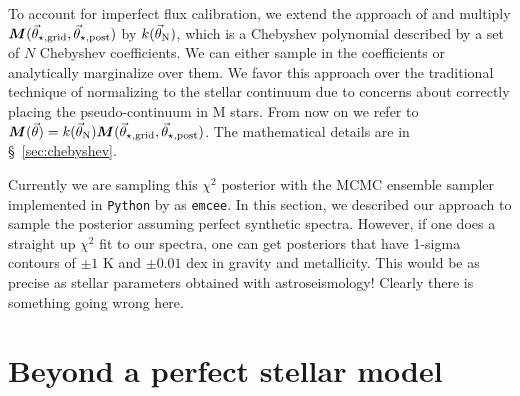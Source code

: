\documentclass[preprint]{aastex} %
\newcommand{\vt}{\vec{\theta}}
\newcommand{\vg}{\vt_{\star, {\rm grid}}}
\newcommand{\vpp}{\vt_{\star, {\rm post}}}
\newcommand{\vN}{\vt_{\rm N}}
\newcommand{\fM}{ {\bm M}}
\begin{document}
To account for imperfect flux calibration, we extend the approach of \citet{elh+06} and multiply $\fM(\vg, \vpp)$ by $k(\vN)$, which is a Chebyshev polynomial described by a set of $N$ Chebyshev coefficients. We can either sample in the coefficients or analytically marginalize over them. We favor this approach over the traditional technique of normalizing to the stellar continuum due to concerns about correctly placing the pseudo-continuum in M stars. From now on we refer to $\fM(\vt) = k(\vN) \fM(\vg, \vpp)$. The mathematical details are in \S~\ref{sec:chebyshev}.

Currently we are sampling this $\chi^2$ posterior with the MCMC ensemble sampler \citep{gw10} implemented in \texttt{Python} by \citet{fhl+12} as \texttt{emcee}. In this section, we described our approach to sample the posterior assuming perfect synthetic spectra. However, if one does a straight up $\chi^2$ fit to our spectra, one can get posteriors that have 1-sigma contours of $\pm 1$ K and $\pm 0.01$ dex in gravity and metallicity. This would be as precise as stellar parameters obtained with astroseismology! Clearly there is something going wrong here.

\section{Beyond a perfect stellar model}
\label{sec:residuals}
\end{document}
